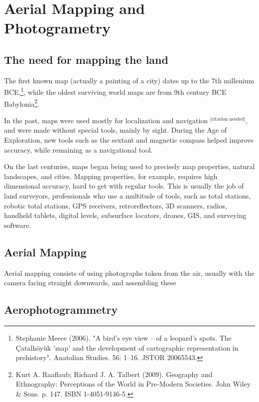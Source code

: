 

\chapter{Aerial Mapping and Photogrametry} \label{chap:2}



\section{The need for mapping the land}
The first known map (actually a painting of a city) dates up to the 7th millenium BCE,\footnote{Stephanie Meece (2006). "A bird's eye view – of a leopard's spots. The Çatalhöyük 'map' and the development of cartographic representation in prehistory". Anatolian Studies. 56: 1–16. JSTOR 20065543.
}, while the oldest surviving world maps are from 9th century BCE Babylonia\footnote{ Kurt A. Raaflaub; Richard J. A. Talbert (2009). Geography and Ethnography: Perceptions of the World in Pre-Modern Societies. John Wiley & Sons. p. 147. ISBN 1-4051-9146-5.}.

In the past, maps were used mostly for localization and navigation $^{\text{[citation needed]}}$, and were made without special tools, mainly by sight. During the Age of Exploration, new tools such as the sextant and magnetic compass helped improve accuracy, while remaining as a navigational tool.

On the last centuries, maps began being used to precisely map properties, natural landscapes, and cities. Mapping properties, for example, requires high dimensional accuracy, hard to get with regular tools. This is usually the job of land surveyors, professionals who use a multitude of tools, such as total stations, robotic total stations, GPS receivers, retroreflectors, 3D scanners, radios, handheld tablets, digital levels, subsurface locators, drones, GIS, and surveying software.


\section{Aerial Mapping}
Aerial mapping consists of using photographs taken from the air, usually with the camera facing straight downwards, and assembling these 




\section{Aerophotogrammetry}
